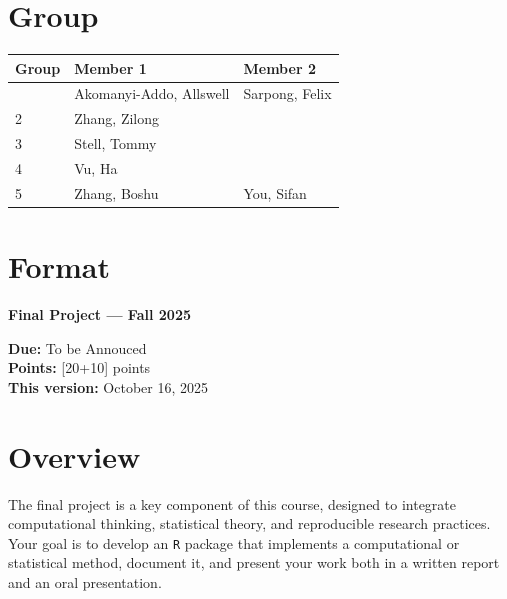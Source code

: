 \documentclass[
  letterpaper,
  DIV=11,
  numbers=noendperiod]{scrreprt}
\begin{document}
\section{Group}\label{group}

\begin{longtable}[]{@{}lll@{}}
\toprule\noalign{}
Group & Member 1 & Member 2 \\
\midrule\noalign{}
\endhead
\bottomrule\noalign{}
\endlastfoot
1 & Akomanyi-Addo, Allswell & Sarpong, Felix \\
2 & Zhang, Zilong & \\
3 & Stell, Tommy & \\
4 & Vu, Ha & \\
5 & Zhang, Boshu & You, Sifan \\
\end{longtable}

\section{Format}\label{format}

\begin{tcolorbox}[enhanced jigsaw, leftrule=.75mm, opacityback=0, colframe=quarto-callout-note-color-frame, arc=.35mm, colback=white, breakable, left=2mm, toprule=.15mm, bottomrule=.15mm, rightrule=.15mm]
\begin{minipage}[t]{5.5mm}
\textcolor{quarto-callout-note-color}{\faInfo}
\end{minipage}%
\begin{minipage}[t]{\textwidth - 5.5mm}

\vspace{-3mm}\textbf{Final Project --- Fall 2025}\vspace{3mm}

\textbf{Due:} To be Annouced\\
\textbf{Points:} {{[}20+10{]} points}\\
\textbf{This version:} October 16, 2025

\end{minipage}%
\end{tcolorbox}

\section{Overview}\label{overview-1}

The final project is a key component of this course, designed to
integrate computational thinking, statistical theory, and reproducible
research practices. Your goal is to develop an \texttt{R} package that
implements a computational or statistical method, document it, and
present your work both in a written report and an oral presentation.
\end{document}
